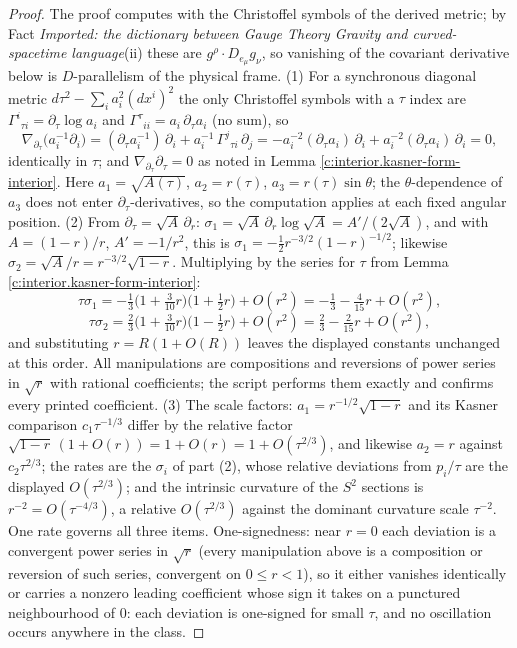 \documentclass[11pt]{article}
\theoremstyle{definition}
\theoremstyle{plain}
\begin{document}
\begin{proof}
The proof computes with the Christoffel symbols of the derived metric; by Fact \emph{Imported: the dictionary between Gauge Theory Gravity and curved-spacetime language}(ii) these are $g^\rho \cdot D_{e_\mu} g_\nu$, so vanishing of the covariant derivative below is $D$-parallelism of the physical frame. (1) For a synchronous diagonal metric $d\tau^2 - \sum_i a_i^2 (dx^i)^2$ the only Christoffel symbols with a $\tau$ index are $\Gamma^i{}_{\tau i} = \partial_\tau \log a_i$ and $\Gamma^\tau{}_{ii} = a_i\,\partial_\tau a_i$ (no sum), so
\[
\nabla_{\partial_\tau}\bigl(a_i^{-1}\partial_i\bigr)
= (\partial_\tau a_i^{-1})\,\partial_i + a_i^{-1}\,\Gamma^j{}_{\tau i}\,\partial_j
= -a_i^{-2}(\partial_\tau a_i)\,\partial_i + a_i^{-2}(\partial_\tau a_i)\,\partial_i = 0 ,
\]
identically in $\tau$; and $\nabla_{\partial_\tau}\partial_\tau = 0$ as noted in Lemma \ref{c:interior.kasner-form-interior}. Here $a_1 = \sqrt{A(\tau)}$, $a_2 = r(\tau)$, $a_3 = r(\tau)\sin\theta$; the $\theta$-dependence of $a_3$ does not enter $\partial_\tau$-derivatives, so the computation applies at each fixed angular position. (2) From $\partial_\tau = \sqrt{A}\,\partial_r$: $\sigma_1 = \sqrt A\,\partial_r \log\sqrt A = A'/(2\sqrt A)$, and with $A = (1-r)/r$, $A' = -1/r^2$, this is $\sigma_1 = -\tfrac12 r^{-3/2}(1-r)^{-1/2}$; likewise $\sigma_2 = \sqrt A / r = r^{-3/2}\sqrt{1-r}$. Multiplying by the series for $\tau$ from Lemma \ref{c:interior.kasner-form-interior}:
\[
\tau\sigma_1 = -\tfrac13\bigl(1 + \tfrac{3}{10}r\bigr)\bigl(1 + \tfrac12 r\bigr) + O(r^2) = -\tfrac13 - \tfrac{4}{15}r + O(r^2),
\]
\[
\tau\sigma_2 = \tfrac23\bigl(1 + \tfrac{3}{10}r\bigr)\bigl(1 - \tfrac12 r\bigr) + O(r^2) = \tfrac23 - \tfrac{2}{15}r + O(r^2),
\]
and substituting $r = R(1 + O(R))$ leaves the displayed constants unchanged at this order. All manipulations are compositions and reversions of power series in $\sqrt r$ with rational coefficients; the script performs them exactly and confirms every printed coefficient. (3) The scale factors: $a_1 = r^{-1/2}\sqrt{1-r}$ and its Kasner comparison $c_1\tau^{-1/3}$ differ by the relative factor $\sqrt{1-r}\,(1 + O(r)) = 1 + O(r) = 1 + O(\tau^{2/3})$, and likewise $a_2 = r$ against $c_2\tau^{2/3}$; the rates are the $\sigma_i$ of part (2), whose relative deviations from $p_i/\tau$ are the displayed $O(\tau^{2/3})$; and the intrinsic curvature of the $S^2$ sections is $r^{-2} = O(\tau^{-4/3})$, a relative $O(\tau^{2/3})$ against the dominant curvature scale $\tau^{-2}$. One rate governs all three items. One-signedness: near $r = 0$ each deviation is a convergent power series in $\sqrt r$ (every manipulation above is a composition or reversion of such series, convergent on $0 \le r < 1$), so it either vanishes identically or carries a nonzero leading coefficient whose sign it takes on a punctured neighbourhood of $0$: each deviation is one-signed for small $\tau$, and no oscillation occurs anywhere in the class.

\end{proof}
\end{document}
